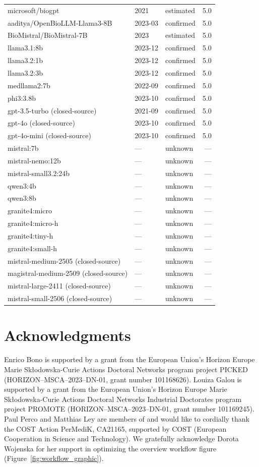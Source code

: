 \documentclass[12pt,letterpaper]{article}
\renewenvironment{table*}{\begin{table}}{\end{table}}
\begin{document}
\begin{table}[!htbp]
\begin{tabularx}{\linewidth}{X l l r}
microsoft/biogpt & 2021 & estimated & 5.0 \\
aaditya/OpenBioLLM-Llama3-8B & 2023-03 & confirmed & 5.0 \\
BioMistral/BioMistral-7B & 2023 & estimated & 5.0 \\
llama3.1:8b & 2023-12 & confirmed & 5.0 \\
llama3.2:1b & 2023-12 & confirmed & 5.0 \\
llama3.2:3b & 2023-12 & confirmed & 5.0 \\
medllama2:7b & 2022-09 & confirmed & 5.0 \\
phi3:3.8b & 2023-10 & confirmed & 5.0 \\
gpt-3.5-turbo (closed-source) & 2021-09 & confirmed & 5.0 \\
gpt-4o (closed-source) & 2023-10 & confirmed & 5.0 \\
gpt-4o-mini (closed-source) & 2023-10 & confirmed & 5.0 \\
mistral:7b & --- & unknown & --- \\
mistral-nemo:12b & --- & unknown & --- \\
mistral-small3.2:24b & --- & unknown & --- \\
qwen3:4b & --- & unknown & --- \\
qwen3:8b & --- & unknown & --- \\
granite4:micro & --- & unknown & --- \\
granite4:micro-h & --- & unknown & --- \\
granite4:tiny-h & --- & unknown & --- \\
granite4:small-h & --- & unknown & --- \\
mistral-medium-2505 (closed-source) & --- & unknown & --- \\
magistral-medium-2509 (closed-source) & --- & unknown & --- \\
mistral-large-2411 (closed-source) & --- & unknown & --- \\
mistral-small-2506 (closed-source) & --- & unknown & --- \\
\bottomrule
\end{tabularx}
\end{table}

\section*{Acknowledgments}

Enrico Bono is supported by a grant from the European Union's Horizon Europe Marie Skłodowska-Curie Actions Doctoral Networks program project PICKED (HORIZON--MSCA--2023--DN-01, grant number 101168626). 
Louiza Galou is supported by a grant from the European Union's Horizon Europe Marie Skłodowska-Curie Actions Doctoral Networks Industrial Doctorates program project PROMOTE (HORIZON--MSCA--2023--DN-01, grant number 101169245). 
Paul Perco and Matthias Ley are members of and would like to cordially thank the COST Action PerMediK, CA21165, supported by COST (European Cooperation in Science and Technology).
We gratefully acknowledge Dorota Wojenska for her support in optimizing the overview workflow figure (Figure~\ref{fig:workflow_graphic}).
\end{document}
